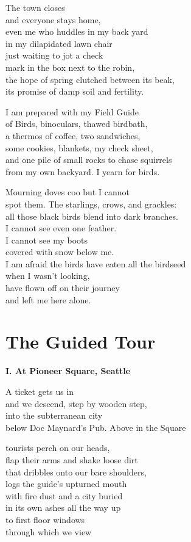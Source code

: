 \documentclass[twoside,10pt]{book}
\begin{document}
The town closes\\
and everyone stays home,\\
even me who huddles in my back yard\\
in my dilapidated lawn chair\\
just waiting to jot a check\\
mark in the box next to the robin,\\
the hope of spring clutched between its beak,\\
its promise of damp soil and fertility.

I am prepared with my Field Guide\\
of Birds, binoculars, thawed birdbath,\\
a thermos of coffee, two sandwiches,\\
some cookies, blankets, my check sheet,\\
and one pile of small rocks to chase squirrels\\
from my own backyard. I yearn for birds.

Mourning doves coo but I cannot\\
spot them. The starlings, crows, and grackles:\\
all those black birds blend into dark branches.\\
I cannot see even one feather.\\
I cannot see my boots\\
covered with snow below me.\\
I am afraid the birds have eaten all the birdseed\\
when I wasn't looking,\\
have flown off on their journey\\
and left me here alone.


\clearpage
\section{The Guided Tour}

{\bf I.  At Pioneer Square, Seattle}

A ticket gets us in\\
and we descend, step by wooden step,\\
into the subterranean city\\
below Doc Maynard's Pub. Above in the Square

tourists perch on our heads,\\
flap their arms and shake loose dirt\\
that dribbles onto our bare shoulders,\\
logs the guide's upturned mouth\\
with fire dust and a city buried\\
in its own ashes all the way up\\
to first floor windows\\
through which we view
\end{document}
